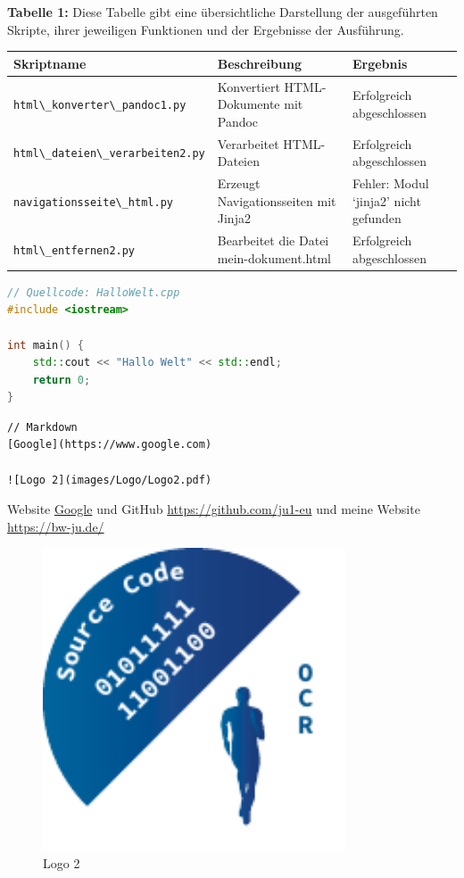 \documentclass{vorlage-design-main}
\begin{document}
\textbf{Tabelle 1:} Diese Tabelle gibt eine übersichtliche Darstellung
der ausgeführten Skripte, ihrer jeweiligen Funktionen und der Ergebnisse
der Ausführung.

\begin{table}[ht]
  \begin{tabular}{@{}lll@{}}
\toprule
Skriptname
 & 
Beschreibung
 & 
Ergebnis
 \\
\midrule[\heavyrulewidth]
\verb|html\_konverter\_pandoc1.py| & Konvertiert
HTML-Dokumente mit Pandoc & Erfolgreich abgeschlossen \\
\verb|html\_dateien\_verarbeiten2.py| & Verarbeitet
HTML-Dateien & Erfolgreich abgeschlossen \\
\verb|navigationsseite\_html.py| & Erzeugt
Navigationsseiten mit Jinja2 & Fehler: Modul `jinja2' nicht gefunden \\
\verb|html\_entfernen2.py| & Bearbeitet die Datei
mein-dokument.html & Erfolgreich abgeschlossen \\
\bottomrule
\end{tabular}%
\end{table}

\newpage

\begin{lstlisting}[language={C++}]
// Quellcode: HalloWelt.cpp
#include <iostream>

int main() {
    std::cout << "Hallo Welt" << std::endl;
    return 0;
}
\end{lstlisting}

\begin{lstlisting}
// Markdown
[Google](https://www.google.com)

![Logo 2](images/Logo/Logo2.pdf)
\end{lstlisting}

Website \href{https://www.google.com}{Google} und GitHub
\url{https://github.com/ju1-eu} und meine Website
\url{https://bw-ju.de/}

\begin{figure}
\centering
\includegraphics[width=0.8\textwidth]{images/Logo/Logo2.pdf}
\caption{Logo 2}
\end{figure}
\end{document}
